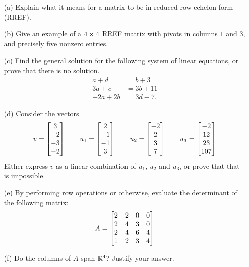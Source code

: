 \documentclass[a4paper]{article}
\begin{document}
\begin{problem}[2012-13]
 \begin{itemize}
  \item[(a)] Explain what it means for a matrix to be in reduced row
   echelon form (RREF). 
  \item[(b)] Give an example of a $4\times 4$ RREF matrix with pivots in
   columns $1$ and $3$, and precisely five nonzero entries. 
  \item[(c)] Find the general solution for the following system of
   linear equations, or prove that there is no solution. 
   \begin{align*}
    a+d &= b+3 \\
    3a+c &= 3b+11 \\
    -2a+2b &= 3d-7.
   \end{align*}
  \item[(d)] Consider the vectors
   \[
    v = \left[\begin{matrix} 3\\ -2\\-3\\-2 \end{matrix}\right] \qquad
    u_1 = \left[\begin{matrix} 2\\-1\\-1\\3\end{matrix}\right] \qquad
    u_2 = \left[\begin{matrix} -2\\2\\3\\7 \end{matrix}\right] \qquad
    u_3 = \left[\begin{matrix} -2\\ 12\\ 23\\ 107\end{matrix}\right]
   \]
   Either express $v$ as a linear combination of $u_1$, $u_2$ and
   $u_3$, or prove that that is impossible. 
  \item[(e)] By performing row operations or otherwise, evaluate the
   determinant of the following matrix: 
   \[ A = \left[\begin{matrix}
       2 & 2 & 0 & 0 \\
       2 & 4 & 3 & 0 \\
       2 & 4 & 6 & 4 \\
       1 & 2 & 3 & 4 
      \end{matrix}\right]
   \]
  \item[(f)] Do the columns of $A$ span ${\mathbb{R}}^4$?  Justify your
   answer.  
 \end{itemize}
\end{problem}
\end{document}
